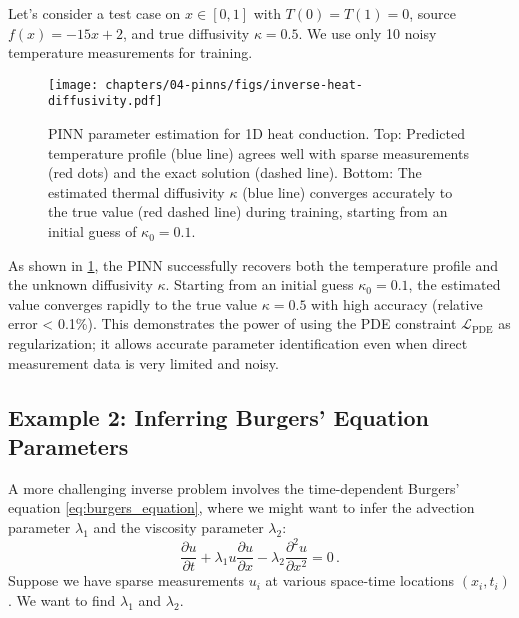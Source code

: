 Let's consider a test case on $x \in [0, 1]$ with $T(0)=T(1)=0$, source $f(x) = -15x + 2$, and true diffusivity $\kappa = 0.5$. We use only 10 noisy temperature measurements for training.

\begin{figure}[htbp]
\centering
\texttt{[image: chapters/04-pinns/figs/inverse-heat-diffusivity.pdf]}
\caption{PINN parameter estimation for 1D heat conduction. Top: Predicted temperature profile (blue line) agrees well with sparse measurements (red dots) and the exact solution (dashed line). Bottom: The estimated thermal diffusivity $\kappa$ (blue line) converges accurately to the true value (red dashed line) during training, starting from an initial guess of $\kappa_0=0.1$.}
\label{fig:heat_results}
\end{figure}

As shown in \cref{fig:heat_results}, the PINN successfully recovers both the temperature profile and the unknown diffusivity $\kappa$. Starting from an initial guess $\kappa_0 = 0.1$, the estimated value converges rapidly to the true value $\kappa = 0.5$ with high accuracy (relative error < 0.1\%). This demonstrates the power of using the PDE constraint $\mathcal{L}_{\text{PDE}}$ as regularization; it allows accurate parameter identification even when direct measurement data is very limited and noisy.

\subsection{Example 2: Inferring Burgers' Equation Parameters}

A more challenging inverse problem involves the time-dependent Burgers' equation \eqref{eq:burgers_equation}, where we might want to infer the advection parameter $\lambda_1$ and the viscosity parameter $\lambda_2$:
%
\begin{equation*}
\frac{\partial u}{\partial t} + \lambda_1 u\frac{\partial u}{\partial x} - \lambda_2 \frac{\partial^2 u}{\partial x^2} = 0\,.
\end{equation*}
%
Suppose we have sparse measurements $u_i$ at various space-time locations $(x_i, t_i)$. We want to find $\lambda_1$ and $\lambda_2$.


